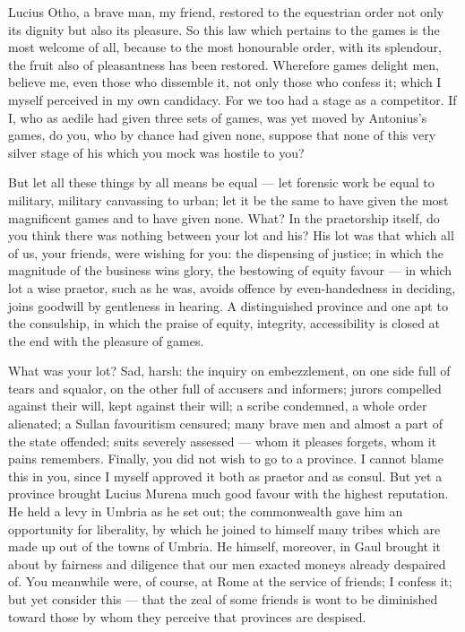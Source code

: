  Lucius Otho, a brave man, my friend, restored to the equestrian order not only its dignity but also its pleasure. So this law which pertains to the games is the most welcome of all, because to the most honourable order, with its splendour, the fruit also of pleasantness has been restored. Wherefore games delight men, believe me, even those who dissemble it, not only those who confess it; which I myself perceived in my own candidacy. For we too had a stage as a competitor. If I, who as aedile had given three sets of games, was yet moved by Antonius's games, do you, who by chance had given none, suppose that none of this very silver stage of his which you mock was hostile to you?

 But let all these things by all means be equal --- let forensic work be equal to military, military canvassing to urban; let it be the same to have given the most magnificent games and to have given none. What? In the praetorship itself, do you think there was nothing between your lot and his? His lot was that which all of us, your friends, were wishing for you: the dispensing of justice; in which the magnitude of the business wins glory, the bestowing of equity favour --- in which lot a wise praetor, such as he was, avoids offence by even-handedness in deciding, joins goodwill by gentleness in hearing. A distinguished province and one apt to the consulship, in which the praise of equity, integrity, accessibility is closed at the end with the pleasure of games.

 What was your lot? Sad, harsh: the inquiry on embezzlement, on one side full of tears and squalor, on the other full of accusers and informers; jurors compelled against their will, kept against their will; a scribe condemned, a whole order alienated; a Sullan favouritism censured; many brave men and almost a part of the state offended; suits severely assessed --- whom it pleases forgets, whom it pains remembers. Finally, you did not wish to go to a province. I cannot blame this in you, since I myself approved it both as praetor and as consul. But yet a province brought Lucius Murena much good favour with the highest reputation. He held a levy in Umbria as he set out; the commonwealth gave him an opportunity for liberality, by which he joined to himself many tribes which are made up out of the towns of Umbria. He himself, moreover, in Gaul brought it about by fairness and diligence that our men exacted moneys already despaired of. You meanwhile were, of course, at Rome at the service of friends; I confess it; but yet consider this --- that the zeal of some friends is wont to be diminished toward those by whom they perceive that provinces are despised.

